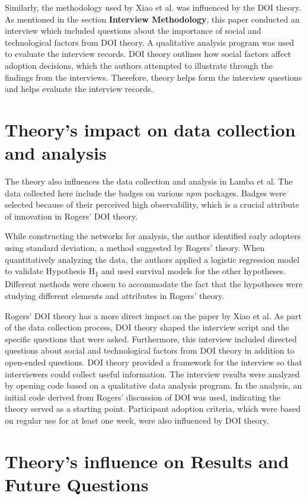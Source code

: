 \documentclass[journal,12pt,onecolumn,]{IEEEtran}
\begin{document}
Similarly, the methodology used by Xiao et al. was influenced by the DOI theory. As mentioned in the section \textbf{Interview Methodology}, this paper conducted an interview which included questions about the importance of social and technological factors from DOI theory.
A qualitative analysis program was used to evaluate the interview records. DOI theory outlines how social factors affect adoption decisions, which the authors attempted to illustrate through the findings from the interviews. Therefore, theory helps form the interview questions and helps evaluate the interview records.
\section{Theory's impact on data collection and analysis}
The theory also influences the data collection and analysis in Lamba et al. The data collected here include the badges on various \textit{npm} packages. Badges were selected because of their perceived high observability, which is a crucial attribute of innovation in Rogers' DOI theory.

While constructing the networks for analysis, the author identified early adopters using standard deviation, a method suggested by Rogers' theory.
When quantitatively analyzing the data, the authors applied a logistic regression model to validate Hypothesis H\textsubscript{1} and used survival models for the other hypotheses. Different methods were chosen to accommodate the fact that the hypotheses were studying different elements and attributes in Rogers' theory.

Rogers' DOI theory has a more direct impact on the paper by Xiao et al. As part of the data collection process, DOI theory shaped the interview script and the specific questions that were asked. Furthermore, this interview included directed questions about social and technological factors from DOI theory in addition to open-ended questions.
DOI theory provided a framework for the interview so that interviewers could collect useful information. The interview results were analyzed by opening code based on a qualitative data analysis program. In the analysis, an initial code derived from Rogers' discussion of DOI was used, indicating the theory served as a starting point.
Participant adoption criteria, which were based on regular use for at least one week, were also influenced by DOI theory.

\section{Theory's influence on Results and Future Questions}
\end{document}
